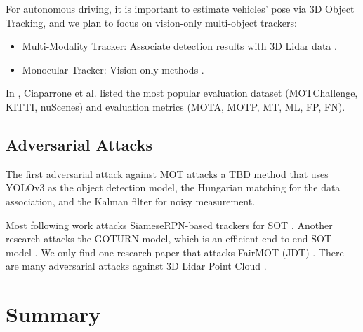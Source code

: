 For autonomous driving, it is important to estimate vehicles' pose via 3D Object Tracking, and we plan to focus on vision-only multi-object trackers: 

\begin{itemize}
    \item Multi-Modality Tracker: Associate detection results with 3D Lidar data \cite{weng20203d}.
    \item Monocular Tracker:  Vision-only methods \cite{wu2021track} \cite{hu2022monocular}.
\end{itemize}

In \cite{ciaparrone2020deep}, Ciaparrone et al. listed the most popular evaluation dataset (MOTChallenge, KITTI, nuScenes) and evaluation metrics (MOTA, MOTP, MT, ML, FP, FN).



\subsection{Adversarial Attacks}

The first adversarial attack against MOT attacks a TBD method that uses YOLOv3 as the object detection model, the Hungarian matching for the data association, and the Kalman filter for noisy measurement.

Most following work attacks SiameseRPN-based trackers for SOT \cite{wu2019sta} \cite{liang2020efficient} \cite{guo2020spark} \cite{chen2020one} \cite{yan2020cooling}. Another research attacks the GOTURN model, which is an efficient end-to-end SOT model \cite{wiyatno2019physical}. We only find one research paper that attacks FairMOT (JDT) \cite{lin2021trasw}. There are many adversarial attacks against 3D Lidar Point Cloud \cite{cheng2021universal} \cite{cheng2022non} \cite{wang2022adversary}.

\section{Summary}

